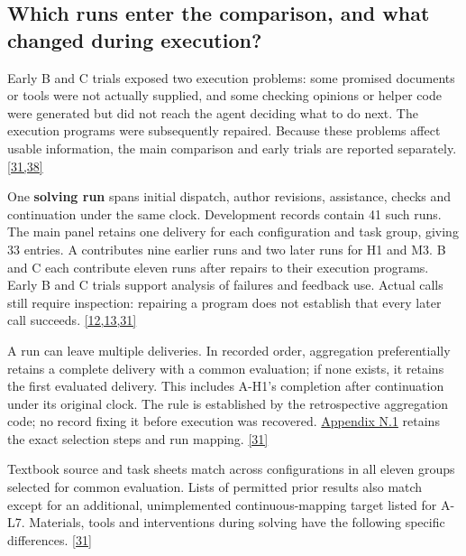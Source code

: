 \subsection[Which runs enter the comparison, and what changed during execution?]{\texorpdfstring{\protect\hypertarget{section-2-3}{}Which runs enter the comparison, and what changed during execution?}{Which runs enter the comparison, and what changed during execution?}}
Early B and C trials exposed two execution problems: some promised documents or tools were not actually supplied, and some checking opinions or helper code were generated but did not reach the agent deciding what to do next. The execution programs were subsequently repaired. Because these problems affect usable information, the main comparison and early trials are reported separately. \hyperlink{ref-31}{\mbox{[31,38]}}

One \textbf{solving run} spans initial dispatch, author revisions, assistance, checks and continuation under the same clock. Development records contain 41 such runs. The main panel retains one delivery for each configuration and task group, giving 33 entries. A contributes nine earlier runs and two later runs for H1 and M3. B and C each contribute eleven runs after repairs to their execution programs. Early B and C trials support analysis of failures and feedback use. Actual calls still require inspection: repairing a program does not establish that every later call succeeds. \hyperlink{ref-12}{\mbox{[12,13,31]}}

A run can leave multiple deliveries. In recorded order, aggregation preferentially retains a complete delivery with a common evaluation; if none exists, it retains the first evaluated delivery. This includes A-H1's completion after continuation under its original clock. The rule is established by the retrospective aggregation code; no record fixing it before execution was recovered. \href{en-appendix.pdf\#n1}{Appendix N.1} retains the exact selection steps and run mapping. \hyperlink{ref-31}{\mbox{[31]}}

Textbook source and task sheets match across configurations in all eleven groups selected for common evaluation. Lists of permitted prior results also match except for an additional, unimplemented continuous-mapping target listed for A-L7. Materials, tools and interventions during solving have the following specific differences. \hyperlink{ref-31}{\mbox{[31]}}

